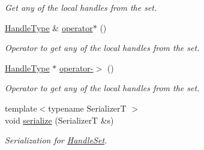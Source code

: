 \begin{DoxyCompactItemize}
\begin{DoxyCompactList}\small\item\em Get any of the local handles from the set. \end{DoxyCompactList}\item 
\hyperlink{structvt_1_1rdma_1_1_handle_set_ab3a698ee86bae503dfa84617205b2dd9}{Handle\+Type} \& \hyperlink{structvt_1_1rdma_1_1_handle_set_a9ad10a3906540909c0344bbf84789fba}{operator$\ast$} ()
\begin{DoxyCompactList}\small\item\em Operator to get any of the local handles from the set. \end{DoxyCompactList}\item 
\hyperlink{structvt_1_1rdma_1_1_handle_set_ab3a698ee86bae503dfa84617205b2dd9}{Handle\+Type} $\ast$ \hyperlink{structvt_1_1rdma_1_1_handle_set_a0f19b37d4a11e43a1ab68710b9d15404}{operator-\/$>$} ()
\begin{DoxyCompactList}\small\item\em Operator to get any of the local handles from the set. \end{DoxyCompactList}\item 
{\footnotesize template$<$typename SerializerT $>$ }\\void \hyperlink{structvt_1_1rdma_1_1_handle_set_a4a78a0c0e54d6044676c560c00fba248}{serialize} (SerializerT \&s)
\begin{DoxyCompactList}\small\item\em Serialization for {\ttfamily \hyperlink{structvt_1_1rdma_1_1_handle_set}{Handle\+Set}}. \end{DoxyCompactList}\end{DoxyCompactItemize}
